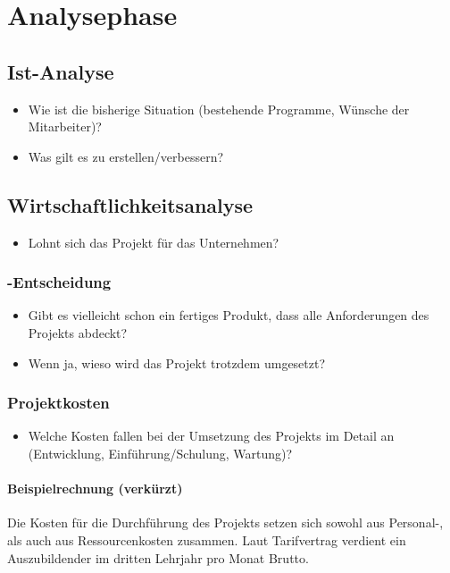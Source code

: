 \section{Analysephase} 
\label{sec:Analysephase}


\subsection{Ist-Analyse} 
\label{sec:IstAnalyse}
\begin{itemize}
	\item Wie ist die bisherige Situation (\zB bestehende Programme, Wünsche der Mitarbeiter)?
	\item Was gilt es zu erstellen/verbessern?
\end{itemize}


\subsection{Wirtschaftlichkeitsanalyse}
\label{sec:Wirtschaftlichkeitsanalyse}
\begin{itemize}
	\item Lohnt sich das Projekt für das Unternehmen?
\end{itemize}


\subsubsection{-Entscheidung}
\label{sec:MakeOrBuyEntscheidung}
\begin{itemize}
	\item Gibt es vielleicht schon ein fertiges Produkt, dass alle Anforderungen des Projekts abdeckt?
	\item Wenn ja, wieso wird das Projekt trotzdem umgesetzt?
\end{itemize}


\subsubsection{Projektkosten}
\label{sec:Projektkosten}
\begin{itemize}
	\item Welche Kosten fallen bei der Umsetzung des Projekts im Detail an (\zB Entwicklung, Einführung/Schulung, Wartung)?
\end{itemize}

\paragraph{Beispielrechnung (verkürzt)}
Die Kosten für die Durchführung des Projekts setzen sich sowohl aus Personal-, als auch aus Ressourcenkosten zusammen.
Laut Tarifvertrag verdient ein Auszubildender im dritten Lehrjahr pro Monat  Brutto. 


